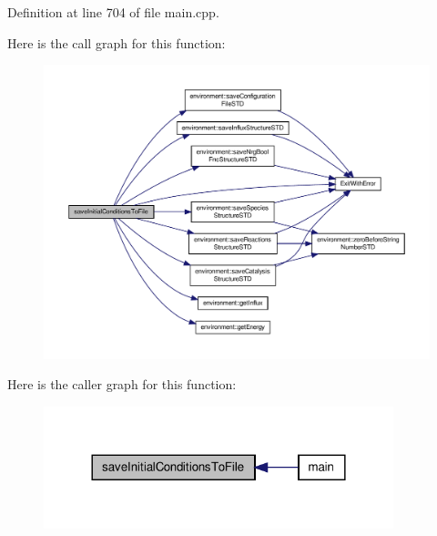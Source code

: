 Definition at line 704 of file main.\-cpp.



Here is the call graph for this function\-:\nopagebreak
\begin{figure}[H]
\begin{center}
\leavevmode
\includegraphics[width=350pt]{a00083_a4665c5f33b43dfc8fae4757552028cc0_cgraph}
\end{center}
\end{figure}




Here is the caller graph for this function\-:\nopagebreak
\begin{figure}[H]
\begin{center}
\leavevmode
\includegraphics[width=288pt]{a00083_a4665c5f33b43dfc8fae4757552028cc0_icgraph}
\end{center}
\end{figure}


